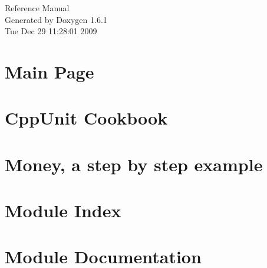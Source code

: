 \documentclass[a4paper]{book}
\begin{document}
\hypersetup{pageanchor=false}
\begin{titlepage}
\vspace*{7cm}
\begin{center}
{\Large Reference Manual}\\
\vspace*{1cm}
{\large Generated by Doxygen 1.6.1}\\
\vspace*{0.5cm}
{\small Tue Dec 29 11:28:01 2009}\\
\end{center}
\end{titlepage}
\clearemptydoublepage
{}
\tableofcontents
\clearemptydoublepage
{}
\hypersetup{pageanchor=true}
\chapter{Main Page}
\label{index}\hypertarget{index}{}
\chapter{CppUnit Cookbook}
\label{cppunit_cookbook}
\hypertarget{cppunit_cookbook}{}

\chapter{Money, a step by step example}
\label{money_example}
\hypertarget{money_example}{}

\chapter{Module Index}

\chapter{Module Documentation}









\printindex
\end{document}
